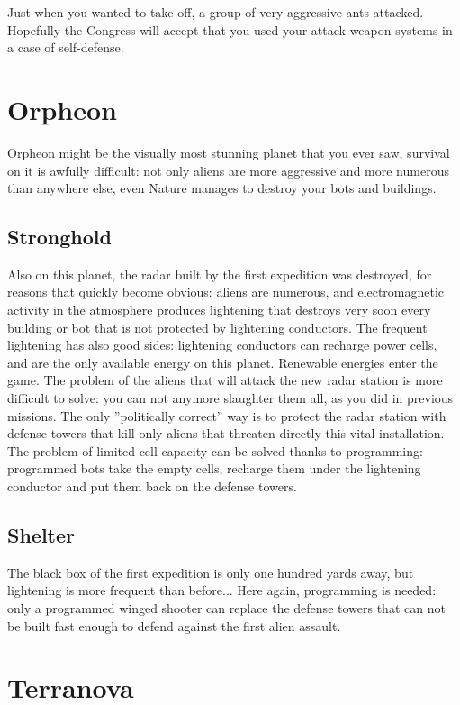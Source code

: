Just when you wanted to take off, a group of very aggressive ants attacked. Hopefully the Congress will accept that you used your attack weapon systems in a case of self-defense.


\newpage
\section{Orpheon}

Orpheon might be the visually most stunning planet that you ever saw, survival on it is awfully difficult: not only aliens are more aggressive and more numerous than anywhere else, even Nature manages to destroy your bots and buildings.


\subsection{Stronghold}

Also on this planet, the radar built by the first expedition was destroyed, for reasons that quickly become obvious: aliens are numerous, and electromagnetic activity in the atmosphere produces lightening that destroys very soon every building or bot that is not protected by lightening conductors. The frequent lightening has also good sides: lightening conductors can recharge power cells, and are the only available energy on this planet. Renewable energies enter the game. The problem of the aliens that will attack the new radar station is more difficult to solve: you can not anymore slaughter them all, as you did in previous missions. The only ''politically correct'' way is to protect the radar station with defense towers that kill only aliens that threaten directly this vital installation. The problem of limited cell capacity can be solved thanks to programming: programmed bots take the empty cells, recharge them under the lightening conductor and put them back on the defense towers.


\subsection{Shelter}

The black box of the first expedition is only one hundred yards away, but lightening is more frequent than before... Here again, programming is needed: only a programmed winged shooter can replace the defense towers that can not be built fast enough to defend against the first alien assault.


\newpage
\section{Terranova}

